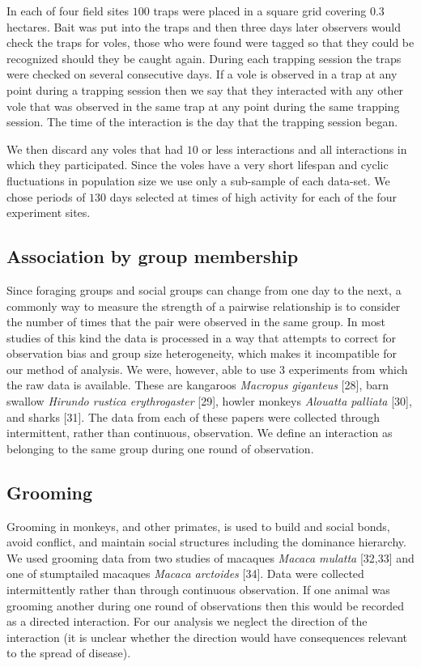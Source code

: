 \documentclass[twocolumn,8pt]{article}
\begin{document}
In each of four field sites $100$ traps were placed in a square grid covering $0.3$ hectares. Bait was put into the traps and then three days later observers would check the traps for voles, those who were found were tagged so that they could be recognized should they be caught again. During each trapping session the traps were checked on several consecutive days. If a vole is observed in a trap at any point during a trapping session then we say that they interacted with any other vole that was observed in the same trap at any point during the same trapping session. The time of the interaction is the day that the trapping session began. 

We then discard any voles that had $10$ or less interactions and all interactions in which they participated. Since the voles have a very short lifespan and cyclic fluctuations in population size we use only a sub-sample of each data-set. We chose periods of $130$ days selected at times of high activity for each of the four experiment sites.

\subsection{Association by group membership}
Since foraging groups and social groups can change from one day to the next, a commonly way to measure the strength of a pairwise relationship is to consider the number of times that the pair were observed in the same group. In most studies of this kind the data is processed in a way that attempts to correct for observation bias and group size heterogeneity, which makes it incompatible for our method of analysis. We were, however, able to use $3$ experiments from which the raw data is available. These are kangaroos \emph{Macropus giganteus} [28], barn swallow \emph{Hirundo rustica erythrogaster} [29], howler monkeys \emph{Alouatta palliata} [30], and sharks [31]. The data from each of these papers were collected through intermittent, rather than continuous, observation. We define an interaction as belonging to the same group during one round of observation.

\subsection{Grooming}
Grooming in monkeys, and other primates, is used to build and social bonds, avoid conflict, and maintain social structures including the dominance hierarchy. We used grooming data from two studies of macaques \emph{Macaca mulatta} [32,33] and one of stumptailed macaques \emph{Macaca arctoides} [34]. Data were collected intermittently rather than through continuous observation. If one animal was grooming another during one round of observations then this would be recorded as a directed interaction. For our analysis we neglect the direction of the interaction (it is unclear whether the direction would have consequences relevant to the spread of disease).
\end{document}
